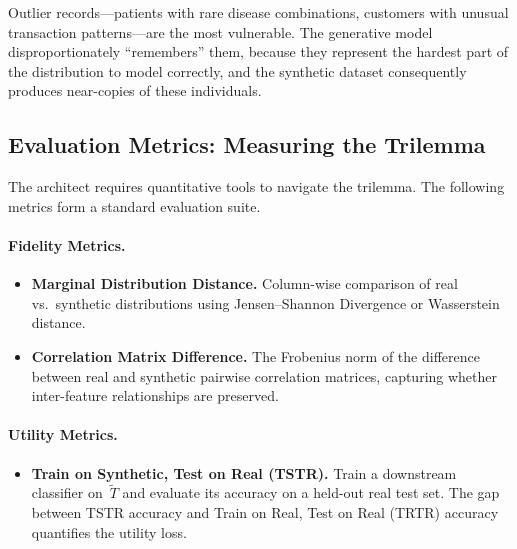Outlier records---patients with rare disease combinations, customers
with unusual transaction patterns---are the most vulnerable.
The generative model disproportionately ``remembers'' them, because
they represent the hardest part of the distribution to model
correctly, and the synthetic dataset consequently produces near-copies
of these individuals.

\subsection{Evaluation Metrics: Measuring the Trilemma}
\label{subsec:synth-metrics}

The architect requires quantitative tools to navigate the trilemma.
The following metrics form a standard evaluation suite.

\paragraph{Fidelity Metrics.}
\begin{itemize}
  \item \textbf{Marginal Distribution Distance.}
    Column-wise comparison of real vs.\ synthetic distributions using
    Jensen--Shannon Divergence or Wasserstein distance.
  \item \textbf{Correlation Matrix Difference.}
    The Frobenius norm of the difference between real and synthetic
    pairwise correlation matrices, capturing whether inter-feature
    relationships are preserved.
\end{itemize}

\paragraph{Utility Metrics.}
\begin{itemize}
  \item \textbf{Train on Synthetic, Test on Real (TSTR).}
    Train a downstream classifier on~$\tilde{T}$ and evaluate its
    accuracy on a held-out real test set.
    The gap between TSTR accuracy and Train on Real, Test on Real
    (TRTR) accuracy quantifies the utility loss.
\end{itemize}

